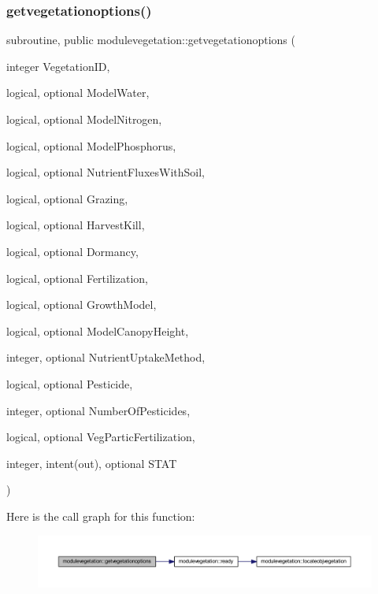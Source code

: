 \subsubsection{\texorpdfstring{getvegetationoptions()}{getvegetationoptions()}}
{\footnotesize\ttfamily subroutine, public modulevegetation\+::getvegetationoptions (\begin{DoxyParamCaption}\item[{integer}]{Vegetation\+ID,  }\item[{logical, optional}]{Model\+Water,  }\item[{logical, optional}]{Model\+Nitrogen,  }\item[{logical, optional}]{Model\+Phosphorus,  }\item[{logical, optional}]{Nutrient\+Fluxes\+With\+Soil,  }\item[{logical, optional}]{Grazing,  }\item[{logical, optional}]{Harvest\+Kill,  }\item[{logical, optional}]{Dormancy,  }\item[{logical, optional}]{Fertilization,  }\item[{logical, optional}]{Growth\+Model,  }\item[{logical, optional}]{Model\+Canopy\+Height,  }\item[{integer, optional}]{Nutrient\+Uptake\+Method,  }\item[{logical, optional}]{Pesticide,  }\item[{integer, optional}]{Number\+Of\+Pesticides,  }\item[{logical, optional}]{Veg\+Partic\+Fertilization,  }\item[{integer, intent(out), optional}]{S\+T\+AT }\end{DoxyParamCaption})}

Here is the call graph for this function\+:\nopagebreak
\begin{figure}[H]
\begin{center}
\leavevmode
\includegraphics[width=350pt]{namespacemodulevegetation_a95ec1a8e366b1743687f4824f5ac8672_cgraph}
\end{center}
\end{figure}
\mbox{\label{namespacemodulevegetation_aede0fbef50c854f21b7dc76d3534b847}} 
